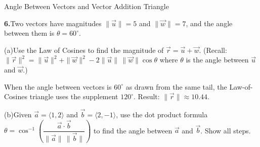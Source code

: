 \documentclass[10pt]{article}
\begin{document}
\begin{notesbox}{Angle Between Vectors and Vector Addition Triangle}

\textbf{6.}\quad Two vectors have magnitudes $\|\vec{u}\| = 5$ and $\|\vec{w}\| = 7$,
and the angle between them is $\theta = 60^\circ$.

\vspace{4pt}
(a)\quad Use the Law of Cosines to find the magnitude of $\vec{r} = \vec{u} + \vec{w}$.
(Recall: $\|\vec{r}\|^2 = \|\vec{u}\|^2 + \|\vec{w}\|^2 - 2\|\vec{u}\|\,\|\vec{w}\|\cos\theta$
where $\theta$ is the angle between $\vec{u}$ and $\vec{w}$.)

\vspace{4pt}

\begin{teachernote}
When the angle between vectors is $60^\circ$ as drawn from the same tail, the Law-of-Cosines triangle uses the supplement $120^\circ$. Result: $\|\vec{r}\|\approx10.44$.
\end{teachernote}

\vspace{8pt}
(b)\quad Given $\vec{a} = \langle 1, 2\rangle$ and $\vec{b} = \langle 2, -1\rangle$,
use the dot product formula $\theta = \cos^{-1}\!\left(\dfrac{\vec{a}\cdot\vec{b}}{\|\vec{a}\|\,\|\vec{b}\|}\right)$
to find the angle between $\vec{a}$ and $\vec{b}$. Show all steps.

\vspace{4pt}

\end{notesbox}
\end{document}
